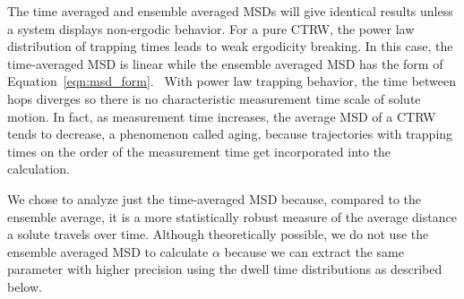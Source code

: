 \documentclass[12pt]{article}
\begin{document}
  The time averaged and ensemble averaged MSDs will give identical results 
  unless a system displays non-ergodic behavior. For a pure CTRW, the power 
  law distribution of trapping times leads to weak ergodicity breaking.
  In this case, the time-averaged MSD is linear while the ensemble averaged
  MSD has the form of Equation~\ref{eqn:msd_form}.~\cite{meroz_toolbox_2015} With
  power law trapping behavior, the time between hops diverges so there is no 
  characteristic measurement time scale of solute motion. In fact, as measurement 
  time increases, the average MSD of a CTRW tends to decrease, a phenomenon called
  aging, because trajectories with trapping times on the order of the measurement 
  time get incorporated into the calculation.~\cite{bel_weak_2005}
  
  We chose to analyze just the time-averaged MSD because, compared to the ensemble
  average, it is a more statistically robust measure of the average distance a 
  solute travels over time. 
  Although theoretically possible, we do not use the ensemble averaged MSD to 
  calculate $\alpha$ because we can extract the same parameter with higher 
  precision using the dwell time distributions as described below.
  
\end{document}
